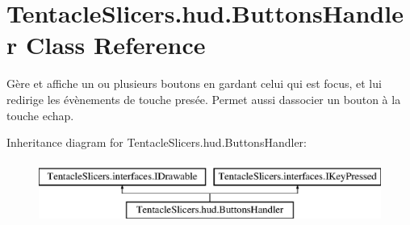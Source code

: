 \hypertarget{class_tentacle_slicers_1_1hud_1_1_buttons_handler}{}\section{Tentacle\+Slicers.\+hud.\+Buttons\+Handler Class Reference}
\label{class_tentacle_slicers_1_1hud_1_1_buttons_handler}


Gère et affiche un ou plusieurs boutons en gardant celui qui est focus, et lui redirige les évènements de touche presée. Permet aussi d\textquotesingle{}associer un bouton à la touche echap.  


Inheritance diagram for Tentacle\+Slicers.\+hud.\+Buttons\+Handler\+:\begin{figure}[H]
\begin{center}
\leavevmode
\includegraphics[height=2.000000cm]{class_tentacle_slicers_1_1hud_1_1_buttons_handler}
\end{center}
\end{figure}
